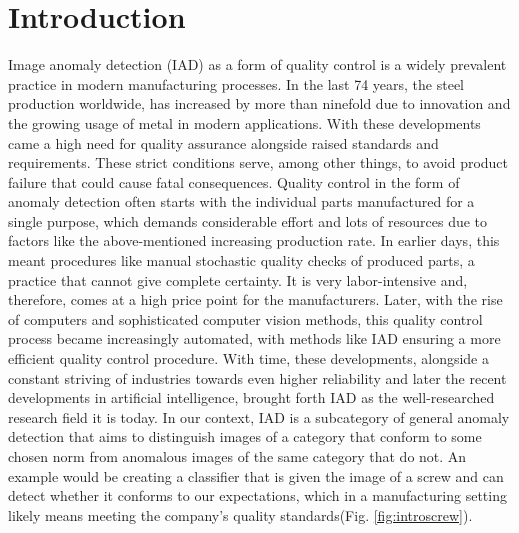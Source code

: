 \chapter{Introduction}
\label{chap:introduction}

Image anomaly detection (IAD) as a form of quality control is a widely prevalent practice in modern manufacturing processes. In the last 74 years, the steel production worldwide, 
has increased by more than ninefold \cite{worldsteel} due to innovation and the growing usage of metal in modern applications. 
With these developments came a high need for quality 
assurance alongside raised standards and requirements. These strict conditions serve, among other things, to avoid product failure that could cause fatal consequences. Quality control in the form of anomaly detection often 
starts with the individual parts manufactured for a single purpose, which demands considerable effort and lots of resources due to factors like 
the above-mentioned increasing production rate. 
In earlier days, this meant procedures like manual stochastic quality checks of produced parts, a practice that cannot give 
complete certainty. It is very labor-intensive and, therefore, comes at a high price point for the manufacturers. Later, with the rise of computers and sophisticated computer vision methods, 
this quality control process became increasingly automated, with methods like IAD ensuring a more efficient quality control procedure. With time, these developments, 
alongside a constant striving of industries towards even higher reliability and later the recent developments in artificial intelligence, brought forth IAD as the 
well-researched research field it is today.\newline 
In our context, IAD is a subcategory of general anomaly detection 
that aims to distinguish images of a category that conform to some chosen norm from anomalous images of the same category that do not. 
An example would be creating a classifier that is given the image of a screw and can detect whether it conforms to our expectations, 
which in a manufacturing setting likely means meeting the company's quality standards(Fig. \ref{fig:introscrew}).



